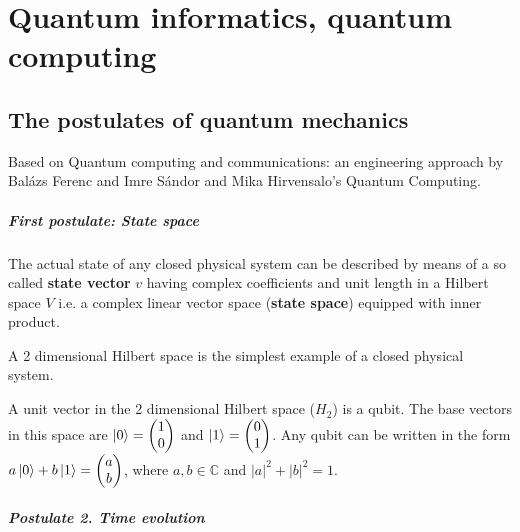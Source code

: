 \chapter{Quantum informatics, quantum computing}

\section{The postulates of quantum mechanics}

Based on Quantum  computing  and  communications: an  engineering  approach by Balázs Ferenc and Imre Sándor \cite{ImreSandor} and Mika Hirvensalo's Quantum Computing\cite{Hirvensalo}.



\paragraph{First postulate: State space}

The actual state of any closed physical system can be described by means of a so called \textbf{state vector} $v$ having complex coefficients and unit length in a Hilbert space $V$ i.e. a complex linear vector space (\textbf{state space}) equipped with inner product.

A 2 dimensional Hilbert space is the simplest example of a closed physical system.

 A unit vector in the 2 dimensional Hilbert space ($H_2$) is a qubit. The base vectors in this space are $\ket{0} = \begin{pmatrix} 1 \\ 0 \end{pmatrix}$ and $\ket{1} = \begin{pmatrix} 0 \\ 1 \end{pmatrix}$. Any qubit can be written in the form $a\ket{0} + b\ket{1} = \begin{pmatrix} a \\ b \end{pmatrix}$, where $a, b \in{} \mathds{C}$ and $|a|^2 + |b|^2 = 1$. 

\paragraph{Postulate 2. Time evolution}

